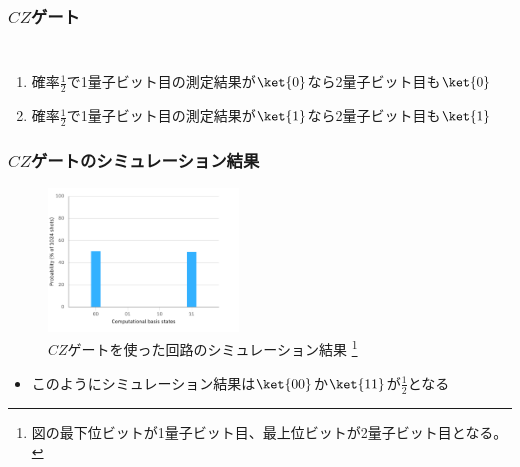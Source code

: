 \begin{frame}
  \frametitle{$CZ$ゲート}

  \begin{columns}
    \begin{column}{0.5\textwidth}
      \begin{figure}
        \centering
      \end{figure}
    \end{column}
    \begin{column}{0.5\textwidth}
    \end{column}
  \end{columns}


  \begin{enumerate}
    \item 確率$\frac{1}{2}$で1量子ビット目の測定結果が$\ket{0}$なら2量子ビット目も$\ket{0}$
    \item 確率$\frac{1}{2}$で1量子ビット目の測定結果が$\ket{1}$なら2量子ビット目も$\ket{1}$
  \end{enumerate}

\end{frame}

\begin{frame}
  \frametitle{$CZ$ゲートのシミュレーション結果}


  \begin{center}
    \begin{figure}
      \includegraphics[width=0.45\textwidth]{./img/cz_gate_histogram.pdf}
      \caption{%
        $CZ$ゲートを使った回路のシミュレーション結果%
        \footnote{図の最下位ビットが1量子ビット目、最上位ビットが2量子ビット目となる。}%
      }
    \end{figure}
  \end{center}
  \begin{itemize}
    \item このようにシミュレーション結果は$\ket{00}$か$\ket{11}$が$\frac{1}{2}$となる
  \end{itemize}
\end{frame}

